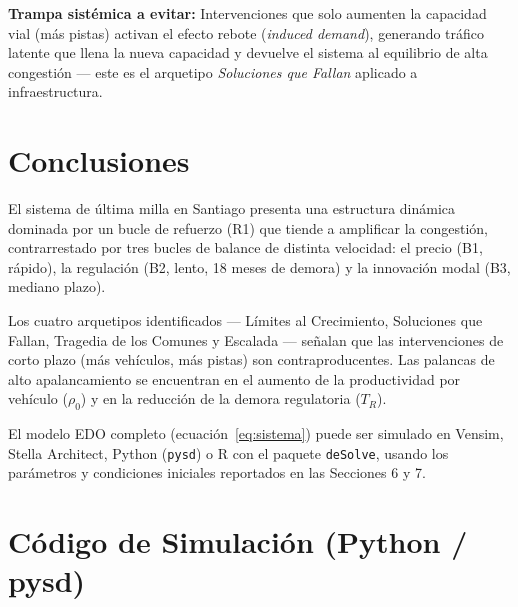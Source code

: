 \documentclass[12pt,a4paper]{article}
\begin{document}
\textbf{Trampa sistémica a evitar:} Intervenciones que solo aumenten
la capacidad vial (más pistas) activan el efecto rebote
(\textit{induced demand}), generando tráfico latente que llena
la nueva capacidad y devuelve el sistema al equilibrio de alta
congestión — este es el arquetipo \textit{Soluciones que Fallan}
aplicado a infraestructura.

\section{Conclusiones}

El sistema de última milla en Santiago presenta una estructura dinámica
dominada por un bucle de refuerzo (R1) que tiende a amplificar la
congestión, contrarrestado por tres bucles de balance de distinta
velocidad: el precio (B1, rápido), la regulación (B2, lento, 18 meses
de demora) y la innovación modal (B3, mediano plazo).

Los cuatro arquetipos identificados — Límites al Crecimiento, Soluciones
que Fallan, Tragedia de los Comunes y Escalada — señalan que las
intervenciones de corto plazo (más vehículos, más pistas) son
contraproducentes. Las palancas de alto apalancamiento se encuentran
en el aumento de la productividad por vehículo ($\rho_0$) y en la
reducción de la demora regulatoria ($T_R$).

El modelo EDO completo (ecuación~\ref{eq:sistema}) puede ser simulado
en Vensim, Stella Architect, Python (\texttt{pysd}) o R con el paquete
\texttt{deSolve}, usando los parámetros y condiciones iniciales
reportados en las Secciones 6 y 7.

\appendix
\section{Código de Simulación (Python / pysd)}
\end{document}

